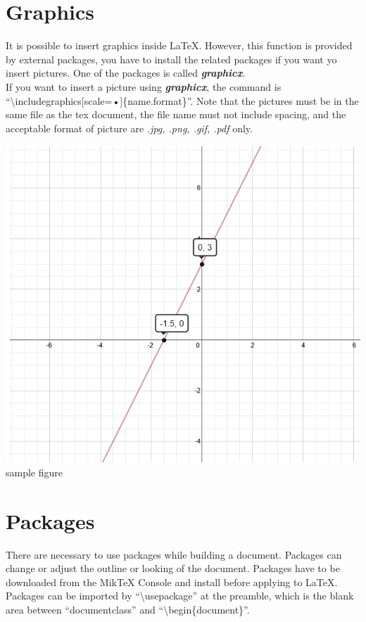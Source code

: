 \documentclass[10pt,a4paper,fleqn]{article}
\def\bslash{\textbackslash} %
\begin{document}
\section{Graphics}
It is possible to insert graphics inside LaTeX. However, this function is provided by external packages, you have to install the related packages if you want yo insert pictures. One of the packages is called \textit{ \textbf{graphicx}}. \\If you want to insert a picture using \textit{ \textbf{graphicx}}, the command is ``\bslash includegraphics[scale=•]\{name.format\}''. Note that the pictures must be in the same file as the tex document, the file name must not include spacing, and the acceptable format of picture are \textit{.jpg, .png, .gif, .pdf} only.

{\centering \includegraphics[scale=0.45]{graph.png}\\ \footnotesize{sample figure} 

}

\section{Packages}
There are necessary to use packages while building a document. Packages can change or adjust the outline or looking of the document. Packages have to be downloaded from the MikTeX Console and install before applying to LaTeX. 
Packages can be imported by ``\textbackslash usepackage'' at the preamble, which is the blank area between ``documentclass'' and ``\bslash begin\{document\}''.
 
\end{document}

